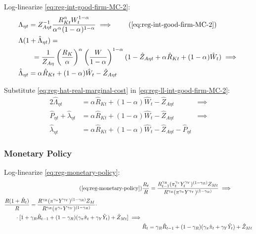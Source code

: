\documentclass[../thesis.tex]{subfiles}
\begin{document}
Log-linearize \ref{eq:reg-int-good-firm-MC-2}:
\begin{alignat}{2}
	& \Lambda_{\eta t} = Z_{A\eta t}^{-1} \frac{R_{Kt}^{{\alpha_{}}} W_t^{1-{\alpha_{}}}}{{\alpha_{}}^{{\alpha_{}}} (1-{\alpha_{}})^{1-{\alpha_{}}}} \implies \tag{\ref{eq:reg-int-good-firm-MC-2}} \\
	& \Lambda (1+ \hat{\Lambda}_{\eta t}) = \nonumber \\ & \qquad = \frac{1}{Z_{A\eta}} \left( \frac{R_{K}}{{\alpha_{}}} \right)^{{\alpha_{}}} \left( \frac{W}{1-{\alpha_{}}} \right)^{1-{\alpha_{}}} (1- \hat{Z}_{A\eta t} + {\alpha_{}} \hat{R}_{Kt} + (1- {\alpha_{}}) \hat{W}_{t} ) \implies \nonumber \\
	& \hat{\Lambda}_{\eta t} = {\alpha_{}} \hat{R}_{Kt} + (1- {\alpha_{}}) \hat{W}_{t} - \hat{Z}_{A\eta t} \label{eq:reg-ll-int-good-firm-MC-2}
\end{alignat}

Substitute \ref{eq:reg-hat-real-marginal-cost} in \ref{eq:reg-ll-int-good-firm-MC-2}:
\begin{alignat}{2}
	\hat{\Lambda}_{\eta t} &= {\alpha_{}} \hat{R}_{Kt} + (1- {\alpha_{}}) \hat{W}_{t} - \hat{Z}_{A\eta t} &\implies \nonumber \\
	\hat{P}_{\eta t} + \hat{\lambda}_{\eta t} &= {\alpha_{}} \hat{R}_{Kt} + (1- {\alpha_{}}) \hat{W}_{t} - \hat{Z}_{A\eta t} &\implies \nonumber \\
	\hat{\lambda}_{\eta t} &= {\alpha_{}} \hat{R}_{Kt} + (1- {\alpha_{}}) \hat{W}_{t} - \hat{Z}_{A\eta t} - \hat{P}_{\eta t} \label{eq:reg-ll-int-good-firm-MC-3}
\end{alignat}


\subsubsection*{Monetary Policy}

Log-linearize \ref{eq:reg-monetary-policy}:
\begin{align}
	\tag{\ref{eq:reg-monetary-policy}}
	& \frac{R_{t}}{R} = \frac{R_{t-1}^{\gamma_R} (\pi_t^{\gamma_\pi} Y_{t}^{\gamma_Y})^{(1-\gamma_R)} Z_{Mt}}{R^{\gamma_R} (\pi^{\gamma_\pi} Y^{\gamma_Y})^{(1-\gamma_R)}} \implies \\
	\begin{split}
		& \frac{R(1+ \hat{R}_t)}{R} = \frac{ R^{\gamma_R} (\pi^{\gamma_\pi} Y^{\gamma_Y})^{(1-\gamma_R)} Z_{M}}{R^{\gamma_R} (\pi^{\gamma_\pi} Y^{\gamma_Y})^{(1-\gamma_R)}} \cdot \\
		& \qquad \cdot [1+ \gamma_R \hat{R}_{t-1} + (1-\gamma_R)(\gamma_\pi \hat{\pi}_t + \gamma_Y \hat{Y}_t) + \hat{Z}_{Mt}] \implies
	\end{split} \nonumber \\
	& \hat{R}_t = \gamma_R \hat{R}_{t-1} + (1-\gamma_R)(\gamma_\pi \hat{\pi}_t + \gamma_Y \hat{Y}_t) + \hat{Z}_{Mt} \label{eq:reg-ll-monetary-policy}
\end{align}
\end{document}

